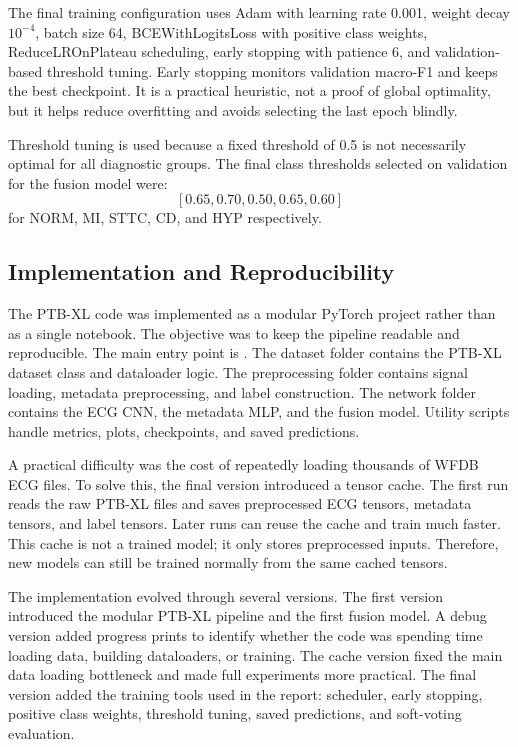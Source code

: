\documentclass[11pt,a4paper]{article}
\newcommand{\code}[1]{\texttt{\detokenize{#1}}}
\begin{document}
The final training configuration uses Adam with learning rate 0.001, weight decay \(10^{-4}\), batch size 64, BCEWithLogitsLoss with positive class weights, ReduceLROnPlateau scheduling, early stopping with patience 6, and validation-based threshold tuning. Early stopping monitors validation macro-F1 and keeps the best checkpoint. It is a practical heuristic, not a proof of global optimality, but it helps reduce overfitting and avoids selecting the last epoch blindly.

Threshold tuning is used because a fixed threshold of 0.5 is not necessarily optimal for all diagnostic groups. The final class thresholds selected on validation for the fusion model were:
\[
[0.65, 0.70, 0.50, 0.65, 0.60]
\]
for NORM, MI, STTC, CD, and HYP respectively.


\subsection{Implementation and Reproducibility}

The PTB-XL code was implemented as a modular PyTorch project rather than as a single notebook. The objective was to keep the pipeline readable and reproducible. The main entry point is \code{main.py}. The dataset folder contains the PTB-XL dataset class and dataloader logic. The preprocessing folder contains signal loading, metadata preprocessing, and label construction. The network folder contains the ECG CNN, the metadata MLP, and the fusion model. Utility scripts handle metrics, plots, checkpoints, and saved predictions.

A practical difficulty was the cost of repeatedly loading thousands of WFDB ECG files. To solve this, the final version introduced a tensor cache. The first run reads the raw PTB-XL files and saves preprocessed ECG tensors, metadata tensors, and label tensors. Later runs can reuse the cache and train much faster. This cache is not a trained model; it only stores preprocessed inputs. Therefore, new models can still be trained normally from the same cached tensors.

The implementation evolved through several versions. The first version introduced the modular PTB-XL pipeline and the first fusion model. A debug version added progress prints to identify whether the code was spending time loading data, building dataloaders, or training. The cache version fixed the main data loading bottleneck and made full experiments more practical. The final version added the training tools used in the report: scheduler, early stopping, positive class weights, threshold tuning, saved predictions, and soft-voting evaluation.
\end{document}
